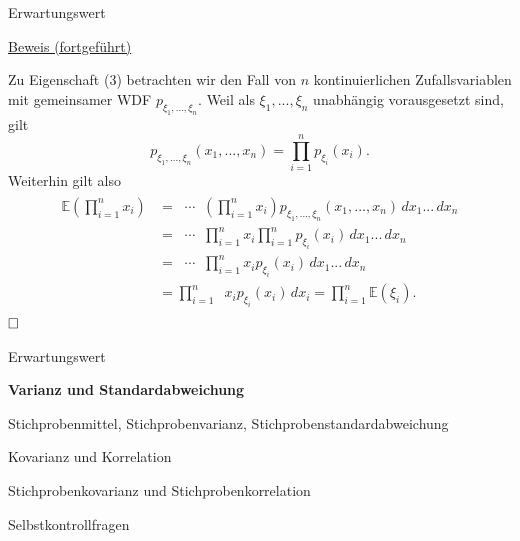 \documentclass[
  8pt,
  ignorenonframetext,
]{beamer}
\DeclareMathOperator*{\intinf}{\int_{-\infty}^{\infty}}
\begin{document}
\begin{frame}{Erwartungswert}
\protect\hypertarget{erwartungswert-8}{}
\footnotesize

\underline{Beweis (fortgeführt)}

Zu Eigenschaft (3) betrachten wir den Fall von \(n\) kontinuierlichen
Zufallsvariablen mit gemeinsamer WDF \(p_{\xi_1,...,\xi_n}\). Weil als
\(\xi_1,...,\xi_n\) unabhängig vorausgesetzt sind, gilt \begin{equation}
p_{\xi_1,...,\xi_n}(x_1,...,x_n) = \prod_{i=1}^n p_{\xi_i}(x_i).
\end{equation} Weiterhin gilt also \begin{align}
\begin{split}
\mathbb{E}\left(\prod_{i=1}^n x_i\right)
& = \intinf\cdots\intinf \left(\prod_{i=1}^n x_i\right)
        p_{\xi_1,...,\xi_n}(x_1,...,x_n) \,dx_1...\,dx_n    \\
& = \intinf\cdots\intinf  \prod_{i=1}^n x_i
         \prod_{i=1}^n p_{\xi_i}(x_i)\,dx_1...\,dx_n    \\
& = \intinf\cdots \intinf  \prod_{i=1}^n x_i p_{\xi_i}(x_i) \,dx_1...\,dx_n \\
& = \prod_{i=1}^n \intinf x_i p_{\xi_i}(x_i) \,dx_i 
 = \prod_{i=1}^n \mathbb{E}(\xi_i).
\end{split}
\end{align} \(\hfill \Box\)
\end{frame}

\begin{frame}{}
\protect\hypertarget{section-6}{}
\large
\vfill

Erwartungswert

\textbf{Varianz und Standardabweichung}

Stichprobenmittel, Stichprobenvarianz, Stichprobenstandardabweichung

Kovarianz und Korrelation

Stichprobenkovarianz und Stichprobenkorrelation

Selbstkontrollfragen \vfill
\end{frame}
\end{document}
